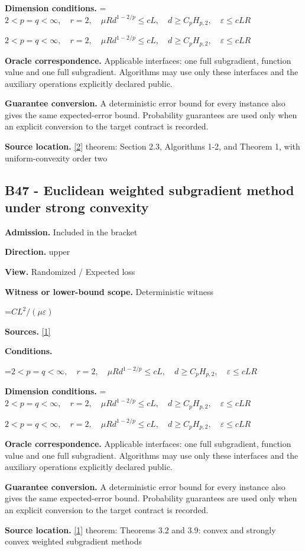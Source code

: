 \documentclass[10pt,a4paper]{article}
\newcommand{\AtlasMath}[1]{\par\begingroup\centering\setbox0=\hbox{$\displaystyle #1$}\ifdim\wd0>1.4\linewidth\typeout{ATLAS WIDE FORMULA: \the\wd0}\fi\ifdim\wd0>\linewidth\resizebox{\linewidth}{!}{\box0}\else\box0\fi\par\endgroup}
\newcommand{\AtlasInlineMath}[1]{\begingroup\setbox0=\hbox{$#1$}\ifdim\wd0>.4\linewidth\endgroup\AtlasMath{#1}\else\endgroup$#1$\fi}
\begin{document}
\textbf{Dimension conditions.} \AtlasInlineMath{2<p=q<\infty,\quad r=2,\quad\mu R d^{1-2/p}\le cL,\quad d\ge C_pH_{p,2},\quad\varepsilon\le cLR}

\textbf{Oracle correspondence.} Applicable interfaces: one full subgradient, function value and one full subgradient. Algorithms may use only these interfaces and the auxiliary operations explicitly declared public.

\textbf{Guarantee conversion.} A deterministic error bound for every instance also gives the same expected-error bound. Probability guarantees are used only when an explicit conversion to the target contract is recorded.

\textbf{Source location.} \href{https://arxiv.org/pdf/1401.1792}{[2]} theorem: Section 2.3, Algorithms 1-2, and Theorem 1, with uniform-convexity order two

\subsection{B47 - Euclidean weighted subgradient method under strong convexity}
\textbf{Admission.} Included in the bracket

\textbf{Direction.} upper

\textbf{View.} Randomized / Expected loss

\textbf{Witness or lower-bound scope.} Deterministic witness

\AtlasMath{CL^2/(\mu\varepsilon)}
\textbf{Sources.} \href{https://arxiv.org/pdf/1405.4980}{[1]}

\textbf{Conditions.} 
\AtlasMath{2<p=q<\infty,\quad r=2,\quad\mu R d^{1-2/p}\le cL,\quad d\ge C_pH_{p,2},\quad\varepsilon\le cLR}


\textbf{Dimension conditions.} \AtlasInlineMath{2<p=q<\infty,\quad r=2,\quad\mu R d^{1-2/p}\le cL,\quad d\ge C_pH_{p,2},\quad\varepsilon\le cLR}

\textbf{Oracle correspondence.} Applicable interfaces: one full subgradient, function value and one full subgradient. Algorithms may use only these interfaces and the auxiliary operations explicitly declared public.

\textbf{Guarantee conversion.} A deterministic error bound for every instance also gives the same expected-error bound. Probability guarantees are used only when an explicit conversion to the target contract is recorded.

\textbf{Source location.} \href{https://arxiv.org/pdf/1405.4980}{[1]} theorem: Theorems 3.2 and 3.9: convex and strongly convex weighted subgradient methods
\end{document}
